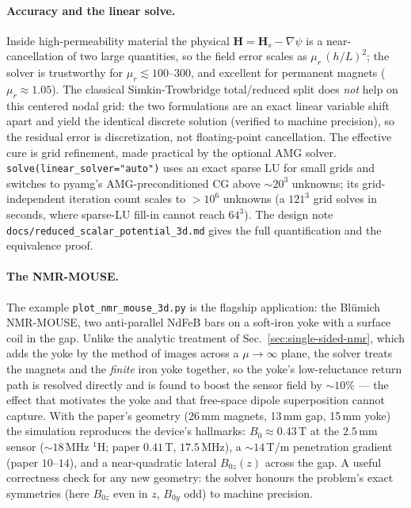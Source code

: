 \documentclass[11pt,oneside]{report}
\newcommand{\code}[1]{\texttt{#1}}
\begin{document}
\paragraph{Accuracy and the linear solve.} Inside high-permeability material the
physical \(\mathbf H=\mathbf H_s-\nabla\psi\) is a near-cancellation of two large
quantities, so the field error scales as \(\mu_r\,(h/L)^2\); the solver is
trustworthy for \(\mu_r\lesssim 100\text{--}300\), and excellent for permanent
magnets (\(\mu_r\approx1.05\)). The classical Simkin-Trowbridge total/reduced
split does \emph{not} help on this centered nodal grid: the two formulations are
an exact linear variable shift apart and yield the identical discrete solution
(verified to machine precision), so the residual error is discretization, not
floating-point cancellation. The effective cure is grid refinement, made practical
by the optional AMG solver. \code{solve(linear\_solver="auto")} uses an exact
sparse LU for small grids and switches to pyamg's AMG-preconditioned CG above
\(\sim\!20^3\) unknowns; its grid-independent iteration count scales to \(>10^6\)
unknowns (a \(121^3\) grid solves in seconds, where sparse-LU fill-in cannot reach
\(64^3\)). The design note \code{docs/reduced\_scalar\_potential\_3d.md} gives the
full quantification and the equivalence proof.

\paragraph{The NMR-MOUSE.} The example \code{plot\_nmr\_mouse\_3d.py} is the
flagship application: the Bl\"umich NMR-MOUSE, two anti-parallel NdFeB bars on a
soft-iron yoke with a surface coil in the gap. Unlike the analytic treatment of
Sec.~\ref{sec:single-sided-nmr}, which adds the yoke by the method of images
across a \(\mu\to\infty\) plane, the solver treats the magnets and the
\emph{finite} iron yoke together, so the yoke's low-reluctance return path is
resolved directly and is found to boost the sensor field by \(\sim\!10\%\) --- the
effect that motivates the yoke and that free-space dipole superposition cannot
capture. With the paper's geometry (26\,mm magnets, 13\,mm gap, 15\,mm yoke) the
simulation reproduces the device's hallmarks: \(B_0\approx0.43\,\)T at the
\(2.5\,\)mm sensor (\(\sim\!18\,\)MHz \(^1\)H; paper \(0.41\,\)T, \(17.5\,\)MHz), a
\(\sim\!14\,\)T/m penetration gradient (paper \(10\text{--}14\)), and a
near-quadratic lateral \(B_{0z}(z)\) across the gap. A useful correctness check
for any new geometry: the solver honours the problem's exact symmetries (here
\(B_{0z}\) even in \(z\), \(B_{0y}\) odd) to machine precision.
\end{document}
